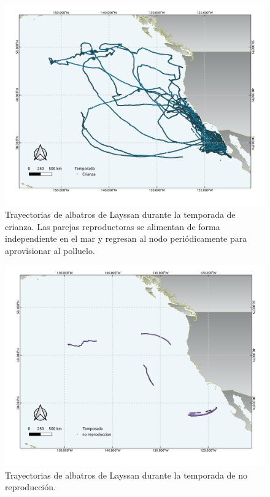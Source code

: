 \begin{figure}[h]
    \centering
    \includegraphics[scale=0.60]{figures/seasonsCrianza.png}
    \caption{Trayectorias de albatros de Layssan durante la temporada de
    crianza. Las parejas reproductoras se alimentan de forma independiente en el
    mar y regresan al nodo periódicamente para aprovisionar al polluelo.}
    \label{fig:crianza}
\end{figure}

\begin{figure}[h]
    \centering
    \includegraphics[scale=0.60]{figures/seasonsNoReproduccion.png}
    \caption{Trayectorias de albatros de Layssan durante la temporada de no
    reproducción.}
    \label{fig:NoReproduccion}
\end{figure}

